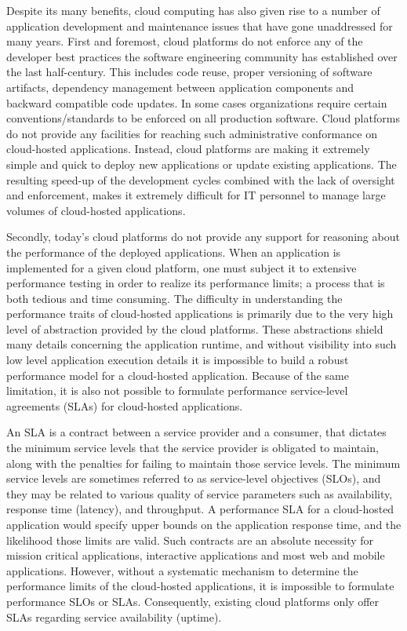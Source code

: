 Despite its many benefits, cloud computing has also given rise to a number of application
development and maintenance issues that have gone unaddressed for many years. 
First and foremost, cloud platforms do not enforce any of the developer best practices
the software engineering community has established over the last half-century. This
includes code reuse, proper versioning of software artifacts, dependency management
between application components and backward compatible code updates. In
some cases organizations require certain conventions/standards to be enforced on
all production software. Cloud platforms do not provide any facilities for reaching
such administrative conformance on cloud-hosted applications. Instead, cloud platforms
are making it extremely simple and quick to deploy new applications or update existing
applications. The resulting speed-up of the development cycles combined with the lack of 
oversight and enforcement, makes it extremely difficult for 
IT personnel to manage large volumes of cloud-hosted applications.

Secondly, today's cloud platforms do not provide any support for reasoning about the 
performance of the deployed applications. When an application is implemented for
a given cloud platform, one must subject it to extensive performance testing in order
to realize its performance limits; a process that is both 
tedious and time consuming. The difficulty in understanding the performance 
traits of cloud-hosted applications is primarily due to the very high level of 
abstraction provided by the cloud platforms. These abstractions shield many details 
concerning the application runtime, and without visibility into such low level application 
execution details it is impossible
to build a robust performance model for a cloud-hosted application. Because of the same
limitation, it is also not possible to formulate performance service-level agreements (SLAs)
for cloud-hosted applications. 

An SLA is a contract between a service provider and a consumer, that dictates the minimum
service levels that the service provider is obligated to maintain, along with the 
penalties for failing to maintain those service levels. The minimum service levels are sometimes
referred to as service-level objectives (SLOs), and they may be related to various quality of service
parameters such as availability, response time (latency), and throughput. A performance SLA for 
a cloud-hosted application
would specify upper bounds on the application response time, and the likelihood those limits
are valid. Such contracts are an absolute necessity for
mission critical applications, interactive applications and most web and mobile applications.
However, without a systematic mechanism to determine the performance limits of the cloud-hosted
applications, it is impossible to formulate performance SLOs or SLAs.
Consequently, existing cloud platforms only offer SLAs regarding service availability (uptime). 

